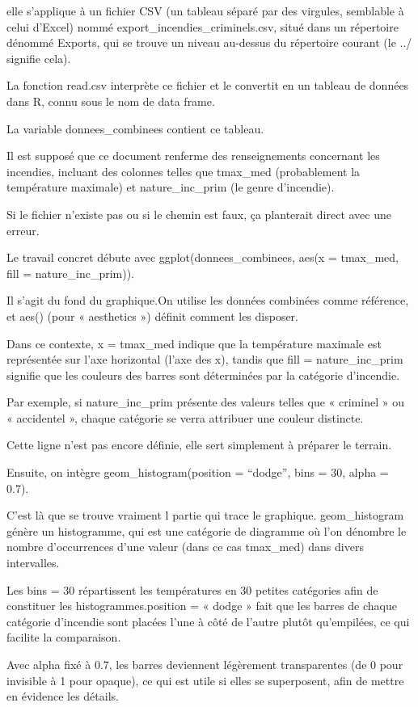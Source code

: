 \documentclass[
]{article}
\begin{document}
elle s'applique à un fichier CSV (un tableau séparé par des virgules,
semblable à celui d'Excel) nommé export\_incendies\_criminels.csv, situé
dans un répertoire dénommé Exports, qui se trouve un niveau au-dessus du
répertoire courant (le ../ signifie cela).

La fonction read.csv interprète ce fichier et le convertit en un tableau
de données dans R, connu sous le nom de data frame.

La variable donnees\_combinees contient ce tableau.

Il est supposé que ce document renferme des renseignements concernant
les incendies, incluant des colonnes telles que tmax\_med (probablement
la température maximale) et nature\_inc\_prim (le genre d'incendie).

Si le fichier n'existe pas ou si le chemin est faux, ça planterait
direct avec une erreur.

Le travail concret débute avec ggplot(donnees\_combinees, aes(x =
tmax\_med, fill = nature\_inc\_prim)).

Il s'agit du fond du graphique.On utilise les données combinées comme
référence, et aes() (pour « aesthetics ») définit comment les disposer.

Dans ce contexte, x = tmax\_med indique que la température maximale est
représentée sur l'axe horizontal (l'axe des x), tandis que fill =
nature\_inc\_prim signifie que les couleurs des barres sont déterminées
par la catégorie d'incendie.

Par exemple, si nature\_inc\_prim présente des valeurs telles que «
criminel » ou « accidentel », chaque catégorie se verra attribuer une
couleur distincte.

Cette ligne n'est pas encore définie, elle sert simplement à préparer le
terrain.

Ensuite, on intègre geom\_histogram(position = ``dodge'', bins = 30,
alpha = 0.7).

C'est là que se trouve vraiment l partie qui trace le graphique.
geom\_histogram génère un histogramme, qui est une catégorie de
diagramme où l'on dénombre le nombre d'occurrences d'une valeur (dans ce
cas tmax\_med) dans divers intervalles.

Les bins = 30 répartissent les températures en 30 petites catégories
afin de constituer les histogrammes.position = « dodge » fait que les
barres de chaque catégorie d'incendie sont placées l'une à côté de
l'autre plutôt qu'empilées, ce qui facilite la comparaison.

Avec alpha fixé à 0.7, les barres deviennent légèrement transparentes
(de 0 pour invisible à 1 pour opaque), ce qui est utile si elles se
superposent, afin de mettre en évidence les détails.
\end{document}
